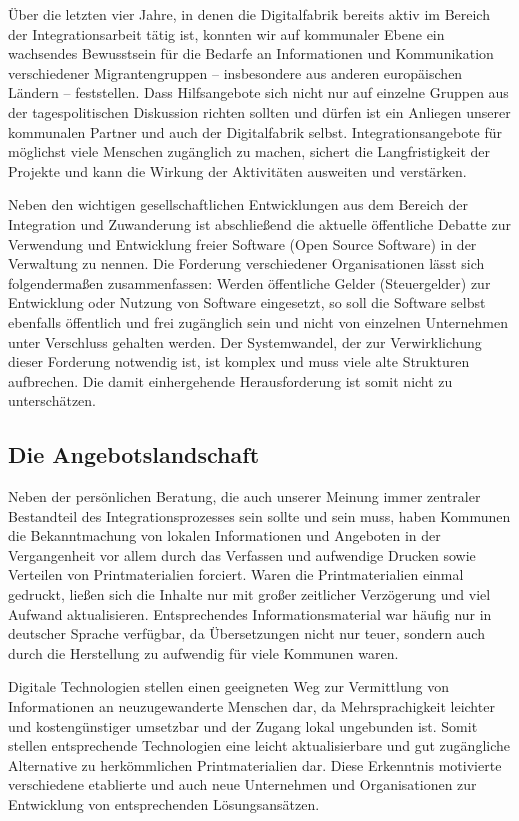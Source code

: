 \documentclass[12pt, a4paper]{article} %
\begin{document}
Über die letzten vier Jahre, in denen die Digitalfabrik bereits aktiv im
Bereich der Integrationsarbeit tätig ist, konnten wir auf kommunaler
Ebene ein wachsendes Bewusstsein für die Bedarfe an Informationen und
Kommunikation verschiedener Migrantengruppen – insbesondere aus anderen
europäischen Ländern – feststellen. Dass Hilfsangebote sich nicht nur
auf einzelne Gruppen aus der tagespolitischen Diskussion richten sollten
und dürfen ist ein Anliegen unserer kommunalen Partner und auch der
Digitalfabrik selbst. Integrationsangebote für möglichst viele Menschen
zugänglich zu machen, sichert die Langfristigkeit der Projekte und kann
die Wirkung der Aktivitäten ausweiten und verstärken.

Neben den wichtigen gesellschaftlichen Entwicklungen aus dem Bereich der
Integration und Zuwanderung ist abschließend die aktuelle öffentliche
Debatte zur Verwendung und Entwicklung freier Software (Open Source
Software) in der Verwaltung zu nennen. Die Forderung verschiedener
Organisationen lässt sich folgendermaßen zusammenfassen: Werden
öffentliche Gelder (Steuergelder) zur Entwicklung oder Nutzung von
Software eingesetzt, so soll die Software selbst ebenfalls öffentlich
und frei zugänglich sein und nicht von einzelnen Unternehmen unter
Verschluss gehalten werden. Der Systemwandel, der zur Verwirklichung
dieser Forderung notwendig ist, ist komplex und muss viele alte
Strukturen aufbrechen. Die damit einhergehende Herausforderung ist somit
nicht zu unterschätzen.

\hypertarget{die-angebotslandschaft}{%
\subsection{Die Angebotslandschaft}\label{die-angebotslandschaft}}

Neben der persönlichen Beratung, die auch unserer Meinung immer
zentraler Bestandteil des Integrationsprozesses sein sollte und sein
muss, haben Kommunen die Bekanntmachung von lokalen Informationen und
Angeboten in der Vergangenheit vor allem durch das Verfassen und
aufwendige Drucken sowie Verteilen von Printmaterialien forciert. Waren
die Printmaterialien einmal gedruckt, ließen sich die Inhalte nur mit
großer zeitlicher Verzögerung und viel Aufwand aktualisieren.
Entsprechendes Informationsmaterial war häufig nur in deutscher Sprache
verfügbar, da Übersetzungen nicht nur teuer, sondern auch durch die
Herstellung zu aufwendig für viele Kommunen waren.

Digitale Technologien stellen einen geeigneten Weg zur Vermittlung von
Informationen an neuzugewanderte Menschen dar, da Mehrsprachigkeit
leichter und kostengünstiger umsetzbar und der Zugang lokal ungebunden
ist. Somit stellen entsprechende Technologien eine leicht
aktualisierbare und gut zugängliche Alternative zu herkömmlichen
Printmaterialien dar. Diese Erkenntnis motivierte verschiedene
etablierte und auch neue Unternehmen und Organisationen zur Entwicklung
von entsprechenden Lösungsansätzen.
\end{document}
